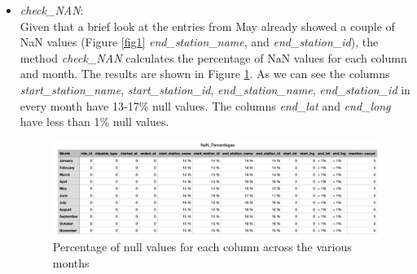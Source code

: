\documentclass[12pt]{article}
\begin{document}
\begin{itemize}
	\item \textit{check\_NAN}:\\
	Given that a brief look at the entries from May already showed a couple of NaN values (Figure \ref{fig1} \textit{end\_station\_name}, and \textit{end\_station\_id}), the method \textit{check\_NAN} calculates the percentage of NaN values for each column and month. The results are shown in Figure \ref{fig4}. As we can see the columns \textit{start\_station\_name}, \textit{start\_station\_id}, \textit{end\_station\_name}, \textit{end\_station\_id} in every month have 13-17\% null values. The columns \textit{end\_lat} and \textit{end\_long} have less than 1\% null values. 
	
	\begin{figure}[h]
	\includegraphics[width=6.5 in, height = 2.3 in]{imgNAN.png}
	\caption{Percentage of null values for each column across the various months}
	\label{fig4}
	\end{figure}
	

\end{itemize}
\end{document}

